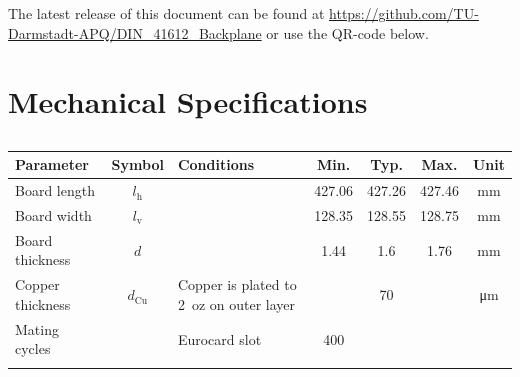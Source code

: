 \documentclass[10pt]{datasheet}
\begin{document}
The latest release of this document can be found at \url{https://github.com/TU-Darmstadt-APQ/DIN_41612_Backplane} or use the QR-code below.

\begin{center}
\end{center}

\clearpage
\section{Mechanical Specifications}
\begin{table}[h]
    \caption{}
    \begin{tabularx}{\textwidth}{l | c | X | c c c | c}
        \thickhline
        \textbf{Parameter} & \textbf{Symbol} & \textbf{Conditions} & \textbf{Min.} & \textbf{Typ.} & \textbf{Max.} &
        \textbf{Unit} \\
        \hline
        Board length  & $l_\text{h}$ & & 427.06 & 427.26 & 427.46 & \unit{\mm} \\
        Board width  & $l_\text{v}$ & & 128.35 & 128.55 & 128.75 & \unit{\mm} \\
        Board thickness  & $d$ & & 1.44 & 1.6 & 1.76 & \unit{\mm} \\
        \hline
        Copper thickness & $d_\text{Cu}$ & Copper is plated to \qty{2}{oz} on outer layer & & 70 & & \unit{\um} \\
        \hline
        Mating cycles & & Eurocard slot & 400 & & & \\
        \thickhline
    \end{tabularx}
\end{table}
\end{document}
